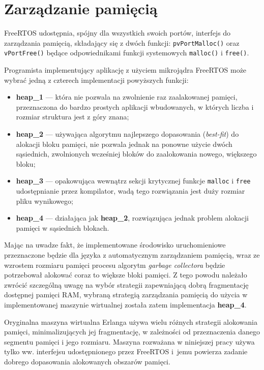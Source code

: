 \section{Zarządzanie pamięcią}
\label{sec:rtosPamiec}

FreeRTOS udostępnia, spójny dla wszystkich swoich portów, interfejs do zarządzania pamięcią, składający się z dwóch funkcji: \texttt{pvPortMalloc()} oraz \texttt{vPortFree()} będące odpowiednikami funkcji systemowych \texttt{malloc()} i \texttt{free()}. 

Programista implementujący aplikację z użyciem mikrojądra FreeRTOS może wybrać jedną z czterech implementacji powyższych funkcji:
\begin{itemize}
\item \textbf{heap\_1} --- która nie pozwala na zwolnienie raz zaalakowanej pamięci, przeznaczona do bardzo prostych aplikacji wbudowanych, w których liczba i rozmiar struktura jest z góry znana;
\item \textbf{heap\_2} --- używająca algorytmu najlepszego dopasowania (\emph{best-fit}) do alokacji bloku pamięci, nie pozwala jednak na ponowne użycie dwóch sąsiednich, zwolnionych wcześniej bloków do zaalokowania nowego, większego bloku;
\item \textbf{heap\_3} --- opakowująca wewnątrz sekcji krytycznej funkcje \texttt{malloc} i \texttt{free} udostępnianie przez kompilator, wadą tego rozwiązania jest duży rozmiar pliku wynikowego;
\item \textbf{heap\_4} --- działająca jak \textbf{heap\_2}, rozwiązująca jednak problem alokacji pamięci w sąsiednich blokach.
\end{itemize}

Mając na uwadze fakt, że implementowane środowisko uruchomieniowe przeznaczone będzie dla języka z automatycznym zarządzaniem pamięcią, wraz ze wzrostem rozmiaru pamięci procesu algorytm \emph{garbage collectora} będzie potrzebował alokować coraz to większe bloki pamięci. Z tego powodu należało zwrócić szczególną uwagę na wybór strategii zapewniającą dobrą fragmentację dostępnej pamięci RAM, wybraną strategią zarządzania pamięcią do użycia w implementowanej maszynie wirtualnej została zatem implementacja \textbf{heap\_4}.

Oryginalna maszyna wirtualna Erlanga używa wielu różnych strategii alokowania pamięci, minimalizujących jej fragmentację, w zależności od przeznaczenia danego segmentu pamięci i jego rozmiaru. Maszyna rozważana w niniejszej pracy używa tylko ww. interfejsu udostępnionego przez FreeRTOS i~jemu powierza zadanie dobrego dopasowania alokowanych obszarów pamięci.

